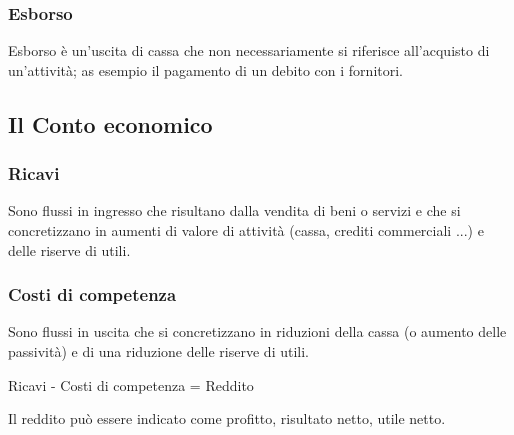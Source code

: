 \documentclass{article}
\begin{document}
\subsubsection{Esborso}
Esborso è un'uscita di cassa che non necessariamente si
riferisce all'acquisto di un'attività; as esempio il pagamento di un debito con i fornitori.



\subsection{Il Conto economico}
\subsubsection{Ricavi}
Sono flussi in ingresso che risultano dalla vendita di beni o servizi e che si concretizzano in
aumenti di valore di attività (cassa, crediti commerciali ...) e delle riserve di utili.


\subsubsection{Costi di competenza}
Sono flussi in uscita che si concretizzano in riduzioni della cassa (o aumento delle passività) e
di una riduzione delle riserve di utili.
\begin{center}
    Ricavi - Costi di competenza = Reddito
\end{center}
Il reddito può essere indicato come profitto, risultato netto, utile netto.
\end{document}

